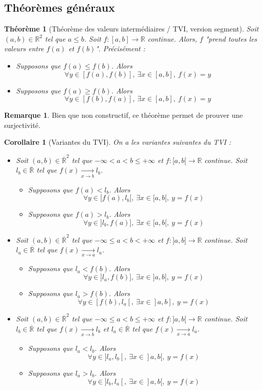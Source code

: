\documentclass[french]{book}
\newcommand{\R}{\mathbb{R}}
\theoremstyle{plain}
\newtheorem{thm}{Théorème}[chapter]
\newtheorem{cor}{Corollaire}[chapter]
\theoremstyle{definition}
\newtheorem{rmq}{Remarque}[chapter]
\theoremstyle{remark}
\begin{document}
\subsection{Théorèmes généraux}
\begin{thm}[Théorème des valeurs intermédiaires / TVI, version segment]
	Soit $(a,b)\in\R^2$ tel que $a\leqslant b$. Soit $f:[a,b]\rightarrow\R$ continue. Alors, $f$ "prend toutes les valeurs entre $f(a)$ et $f(b)$". Précisément : 
	\begin{itemize}
		\item Supposons que $f(a)\leqslant f(b)$. Alors $$\forall y\in\left[f(a),f(b)\right],\ \exists x\in[a,b],\ f(x)=y$$
		\item Supposons que $f(a)\geqslant f(b)$. Alors $$\forall y\in\left[f(b),f(a)\right],\ \exists x\in[a,b],\ f(x)=y$$
	\end{itemize}
\end{thm}
\begin{rmq}
	Bien que non constructif, ce théorème permet de prouver une surjectivité.
\end{rmq}
\begin{cor}[Variantes du TVI]
	On a les variantes suivantes du TVI : \begin{itemize}
		\item Soit $(a,b)\in\overline{\R}^2$ tel que $-\infty<a<b\leqslant +\infty$ et $f:[a,b[\rightarrow\R$ continue. Soit $l_b\in\overline{\R}$ tel que $f(x)\xrightarrow[x\to b]{}l_b$.
		\begin{itemize}
			\item[--] Supposons que $f(a)<l_b$. Alors $$\forall y\in[f(a),l_b[,\ \exists x\in[a,b[,\ y=f(x)$$
			\item[--] Supposons que $f(a)>l_b$. Alors $$\forall y\in]l_b,f(a)],\ \exists x\in[a,b[,\ y=f(x)$$
		\end{itemize}
		\item Soit $(a,b)\in\overline{\R}^2$ tel que $-\infty\leqslant a<b<+\infty$ et $f:]a,b]\rightarrow\R$ continue. Soit $l_a\in\overline{\R}$ tel que $f(x)\xrightarrow[x\to a]{}l_a$.
		\begin{itemize}
			\item[--] Supposons que $l_a<f(b)$. Alors $$\forall y\in]l_a,f(b)],\ \exists x\in]a,b],\ y=f(x)$$
			\item[--] Supposons que $l_a>f(b)$. Alors $$\forall y\in[f(b),l_a[,\ \exists x\in]a,b],\ y=f(x)$$
		\end{itemize}
		\item Soit $(a,b)\in\overline{\R}^2$ tel que $-\infty\leqslant a<b\leqslant +\infty$ et $f:]a,b[\rightarrow\R$ continue. Soit $l_b\in\overline{\R}$ tel que $f(x)\xrightarrow[x\to b]{}l_b$ et $l_a\in\overline{\R}$ tel que $f(x)\xrightarrow[x\to a]{}l_a$.
		\begin{itemize}
			\item[--] Supposons que $l_a<l_b$. Alors $$\forall y\in]l_a,l_b[,\ \exists x\in]a,b[,\ y=f(x)$$
			\item[--] Supposons que $l_a>l_b$. Alors $$\forall y\in]l_b,l_a[,\ \exists x\in]a,b[,\ y=f(x)$$
		\end{itemize}
	\end{itemize}
\end{cor}
\end{document}
